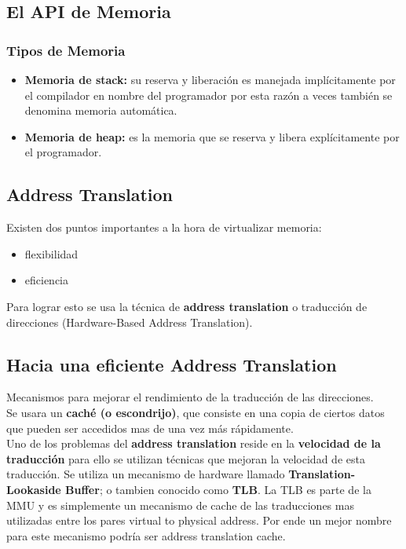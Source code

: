 \documentclass[../main.tex]{subfiles}
\begin{document}
    \subsection{El API de Memoria}
        \subsubsection{Tipos de Memoria}
            \begin{itemize}
                \item \textbf{Memoria de stack:} su reserva y liberación es manejada implícitamente por el compilador en nombre del programador por esta razón a veces también se denomina memoria automática.
                \item \textbf{Memoria de heap:} es la memoria que se reserva y libera explícitamente por el programador.
            \end{itemize}

    \subsection{Address Translation}
        Existen dos puntos importantes a la hora de virtualizar memoria:
        \begin{itemize}
            \item flexibilidad
            \item eficiencia
        \end{itemize}

        Para lograr esto se usa la técnica de \textbf{address translation} o traducción de direcciones (Hardware-Based Address Translation).
    
    \subsection{Hacia una eficiente Address Translation}
        Mecanismos para mejorar el rendimiento de la traducción de las direcciones.\\

        Se usara un \textbf{caché (o escondrijo)}, que consiste en una copia de ciertos datos que pueden ser accedidos mas de una vez más rápidamente.\\

        Uno de los problemas del \textbf{address translation} reside en la \textbf{velocidad de la traducción} para ello se utilizan técnicas que mejoran la velocidad de esta traducción. Se utiliza un mecanismo de hardware llamado \textbf{Translation-Lookaside Buffer}; o tambien conocido como \textbf{TLB}. La TLB es parte de la MMU y es simplemente un mecanismo de cache de las traducciones mas utilizadas entre los pares virtual to physical address. Por ende un mejor nombre para este mecanismo podría ser address translation cache.\\
\end{document}
